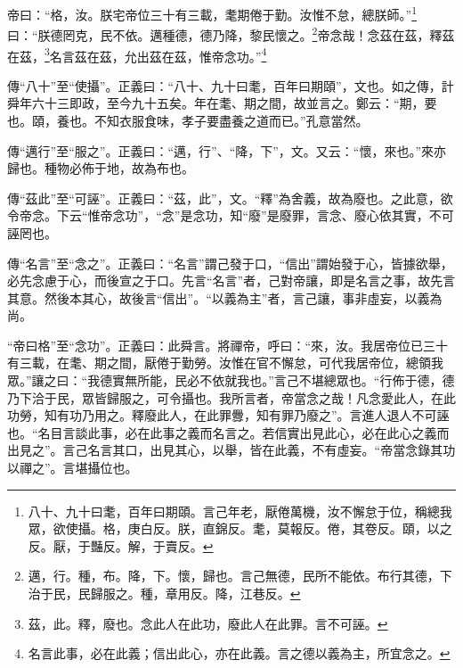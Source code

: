 帝曰：“格，汝。朕宅帝位三十有三載，耄期倦于勤。汝惟不怠，總朕師。”\footnote{八十、九十曰耄，百年曰期頤。言己年老，厭倦萬機，汝不懈怠于位，稱總我眾，欲使攝。格，庚白反。朕，直錦反。耄，莫報反。倦，其卷反。頤，以之反。厭，于豔反。解，于賣反。}曰：“朕德罔克，民不依。邁種德，德乃降，黎民懷之。\footnote{邁，行。種，布。降，下。懷，歸也。言己無德，民所不能依。布行其德，下治于民，民歸服之。種，章用反。降，江巷反。}帝念哉！念茲在茲，釋茲在茲，\footnote{茲，此。釋，廢也。念此人在此功，廢此人在此罪。言不可誣。}名言茲在茲，允出茲在茲，惟帝念功。”\footnote{名言此事，必在此義；信出此心，亦在此義。言之德以義為主，所宜念之。}

{\noindent\zhuan{}\fzbyks 傳“八十”至“使攝”。正義曰：“八十、九十曰耄，百年曰期頤”，文也。如之傳，計舜年六十三即政，至今九十五矣。年在耄、期之間，故並言之。鄭云：“期，要也。頤，養也。不知衣服食味，孝子要盡養之道而已。”孔意當然。 \par}

{\noindent\zhuan{}\fzbyks 傳“邁行”至“服之”。正義曰：“邁，行”、“降，下”，文。又云：“懷，來也。”來亦歸也。種物必佈于地，故為布也。 \par}

{\noindent\zhuan{}\fzbyks 傳“茲此”至“可誣”。正義曰：“茲，此”，文。“釋”為舍義，故為廢也。之此意，欲令帝念。下云“惟帝念功”，“念”是念功，知“廢”是廢罪，言念、廢心依其實，不可誣罔也。 \par}

{\noindent\zhuan{}\fzbyks 傳“名言”至“念之”。正義曰：“名言”謂己發于口，“信出”謂始發于心，皆據欲舉，必先念慮于心，而後宣之于口。先言“名言”者，己對帝讓，即是名言之事，故先言其意。然後本其心，故後言“信出”。“以義為主”者，言己讓，事非虛妄，以義為尚。 \par}

{\noindent\shu{}\fzkt “帝曰格”至“念功”。正義曰：此舜言。將禪帝，呼曰：“來，汝。我居帝位已三十有三載，在耄、期之間，厭倦于勤勞。汝惟在官不懈怠，可代我居帝位，總領我眾。”讓之曰：“我德實無所能，民必不依就我也。”言己不堪總眾也。“行佈于德，德乃下洽于民，眾皆歸服之，可令攝也。我所言者，帝當念之哉！凡念愛此人，在此功勞，知有功乃用之。釋廢此人，在此罪釁，知有罪乃廢之”。言進人退人不可誣也。“名目言談此事，必在此事之義而名言之。若信實出見此心，必在此心之義而出見之”。言己名言其口，出見其心，以舉，皆在此義，不有虛妄。“帝當念錄其功以禪之”。言堪攝位也。 \par}

